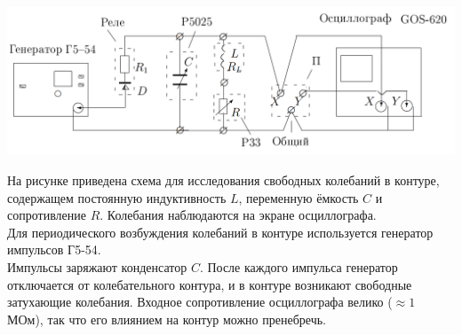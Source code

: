 \documentclass[a4paper,12pt]{article}
\begin{document}
\begin{center}
\includegraphics[scale=0.4]{setup.png} 
\end{center}
На рисунке приведена схема для исследования свободных колебаний в контуре, содержащем постоянную индуктивность $L$, переменную ёмкость $C$ и сопротивление $R$. Колебания наблюдаются на экране осциллографа.\\
Для периодического возбуждения колебаний в контуре используется генератор импульсов Г5-54. \\
Импульсы заряжают конденсатор $C$. После каждого импульса генератор отключается от колебательного контура, и в контуре возникают свободные затухающие колебания. Входное сопротивление осциллографа велико ($\approx 1$ МОм), так что его влиянием на контур можно пренебречь. 
\end{document}
